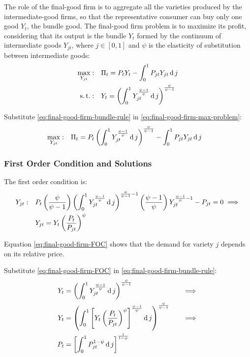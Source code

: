 \documentclass[
	thesis.tex
	]{subfiles}
\begin{document}
The role of the final-good firm is to aggregate all the varieties produced by the intermediate-good firms, so that the representative consumer can buy only one good $Y_t$, the bundle good. The final-good firm problem is to maximize its profit, considering that its output is the bundle $Y_t$ formed by the continuum of intermediate goods $Y_{jt}$, where $j \in [0,1]$ and $\psi$ is the elasticity of substitution between intermediate goods:
\begin{align}
	\label{eq:final-good-firm-max-problem}
	\max_{Y_{jt}}: &\quad \Pi_t = P_t Y_t - \int_{0}^{1} P_{jt} Y_{jt} \operatorname{d} j\\
	\label{eq:final-good-firm-bundle-rule}
	\operatorname{s.t.}: & \quad Y_t = \left( \int_{0}^{1} Y_{jt}^{\frac{\psi-1}{\psi}} \operatorname{d} j \right)^{\frac{\psi}{\psi-1}}
\end{align}

Substitute \ref{eq:final-good-firm-bundle-rule} in \ref{eq:final-good-firm-max-problem}:
\begin{align}
	\label{eq:final-good-firm-max-problem-2}
	\max_{Y_{jt}}: & \quad \Pi_t = P_t \left( \int_{0}^{1} Y_{jt}^{\frac{\psi-1}{\psi}} \operatorname{d} j \right)^{\frac{\psi}{\psi-1}} - \int_{0}^{1} P_{jt} Y_{jt} \operatorname{d} j
\end{align}

\subsubsection*{First Order Condition and Solutions}

The first order condition is:
\begin{align}
	Y_{jt}:\quad & P_t \left( \frac{\psi}{\psi-1} \right) \left( \int_{0}^{1} Y_{jt}^{\frac{\psi-1}{\psi}} \operatorname{d} j \right)^{\frac{\psi}{\psi-1}-1} \left( \frac{\psi-1}{\psi} \right) Y_{jt}^{\frac{\psi-1}{\psi}-1} - P_{jt} = 0 \implies \nonumber \\
	\label{eq:final-good-firm-FOC}
	& Y_{jt} = Y_t \left( \frac{P_t}{P_{jt}} \right)^{\psi}
\end{align}

Equation \ref{eq:final-good-firm-FOC} shows that the demand for variety $j$ depends on its relative price. 

Substitute \ref{eq:final-good-firm-FOC} in \ref{eq:final-good-firm-bundle-rule}:
\begin{alignat}{2}
	Y_t & = \left( \int_{0}^{1} Y_{jt}^{\frac{\psi-1}{\psi}} \operatorname{d} j \right)^{\frac{\psi}{\psi-1}} &\implies \nonumber \\
	Y_t & = \left( \int_{0}^{1} \left[ Y_t \left( \frac{P_t}{P_{jt}} \right)^{\psi} \right]^{\frac{\psi-1}{\psi}} \operatorname{d} j \right)^{\frac{\psi}{\psi-1}} \quad &\implies \nonumber \\
	P_t & = \left[ \int_{0}^{1} P_{jt}^{1-\psi} \operatorname{d} j \right]^{\frac{1}{1-\psi}} \label{eq:final-good-firm-markup}
\end{alignat}
\end{document}

